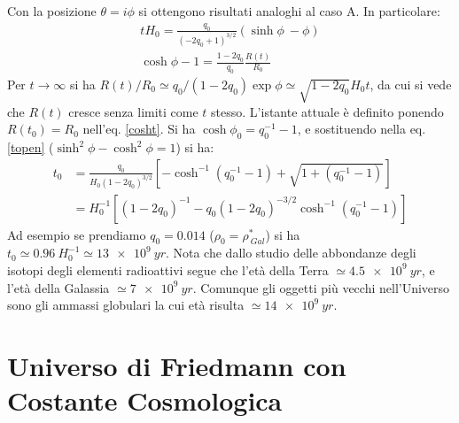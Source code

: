 Con la posizione $\theta = i \phi$ si ottengono risultati analoghi al caso A.
In particolare:
\begin{gather}
  t H_0= \frac {q_0}{(-2q_0+1)^{3/2}} \left( \sinh \phi \ - \phi \right)
  \label{topen} \\
  \cosh \phi -1 = \frac {1-2q_0}{q_0} \frac {R(t)}{R_0}
  \label{cosht}
\end{gather}
Per $t \to \infty$ si ha
$R(t)/R_0 \simeq {q_0}/{(1-2q_0)} {\exp{\phi}} \simeq \sqrt{1-2q_0} H_0 t$, da
cui si vede che $R(t) $ cresce senza limiti come $t$ stesso.  L'istante attuale
è definito ponendo $R(t_0)= R_0$ nell'eq. \eqref{cosht}.  Si ha
$\cosh \phi_0= q_0^{-1}-1$, e sostituendo nella eq. \eqref{topen}
($ \sinh^2 \phi - \cosh^2 \phi =1$) si ha:
\begin{equation}
  \begin{split}
    t_0 &= \frac {q_0}{H_0 (1-2q_0)^{3/2}}
    \left[- \cosh^{-1} (q_0^{-1}-1) + \sqrt{1+(q_0^{-1}-1)} \right] \\
    &= H_0^{-1} \left[ (1-2q_0)^{-1} - q_0 (1-2q_0)^{-3/2} \cosh^{-1}
      (q_0^{-1}-1) \right]
  \end{split}
\end{equation}
Ad esempio se prendiamo $q_0 = 0.014$ ($\rho_0=\rho^*_{~Gal}$) si ha
$t_0 \simeq 0.96~ H_0^{-1} \simeq \SI{13e9}{yr}$.  Nota che dallo studio delle
abbondanze degli isotopi degli elementi radioattivi segue che l'età della Terra
$\simeq \SI{4.5e9}{yr}$, e l'età della Galassia $\simeq \SI{7e9}{yr}$.  Comunque
gli oggetti più vecchi nell'Universo sono gli ammassi globulari la cui età
risulta $\simeq \SI{14e9}{yr}$.

\section{Universo di Friedmann con Costante Cosmologica}

